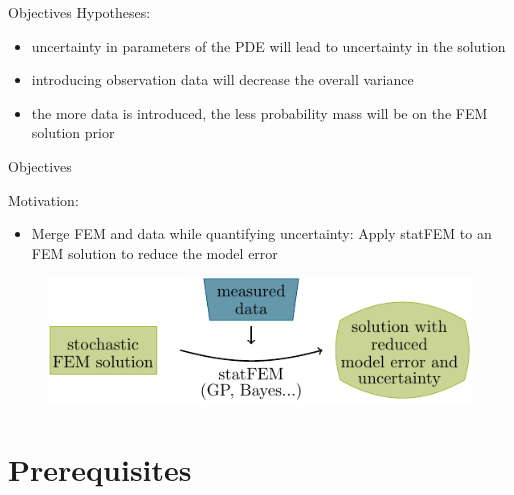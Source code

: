 \documentclass[fleqn,11pt,aspectratio=43]{beamer}
\begin{document}
\begin{frame}{Objectives}
Hypotheses: \\

\begin{itemize}
	\item uncertainty in parameters of the PDE will lead to uncertainty in the solution
	\item introducing observation data will decrease the overall variance
	\item the more data is introduced, the less probability mass will be on the FEM solution prior
\end{itemize}



\end{frame}



\begin{frame}{Objectives}

Motivation:
\begin{itemize}
  \item Merge FEM and data while quantifying uncertainty:
   Apply statFEM to an FEM solution to reduce the model error
      
 
\end{itemize}

\begin{figure}[h]
\begin{center}
\includegraphics[scale=1]{intro}
\end{center}
\end{figure}

\end{frame}










\part{Prerequisites}
\begin{frame}[plain]
  \partpage
\end{frame}
\end{document}
